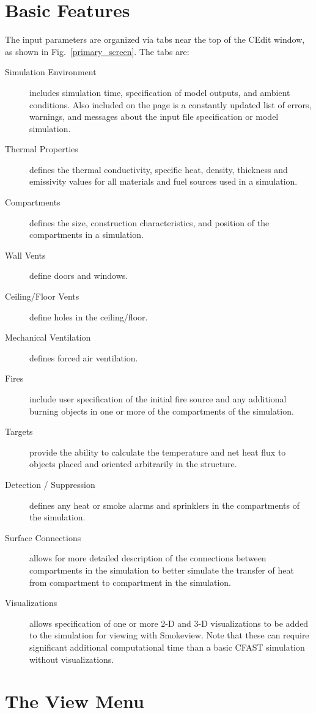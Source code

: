 \section{Basic Features}

The input parameters are organized via tabs near the top of the CEdit window, as shown in Fig.~\ref{primary_screen}. The tabs are:
\begin{description}
\item[Simulation Environment] includes simulation time, specification of model outputs, and ambient conditions. Also included on the page is a constantly updated list of errors, warnings, and messages about the input file specification or model simulation.
\item[Thermal Properties] defines the thermal conductivity, specific heat, density, thickness and emissivity values for all materials and fuel sources used in a simulation.
\item[Compartments] defines the size, construction characteristics, and position of the compartments in a simulation.
\item[Wall Vents] define doors and windows.
\item[Ceiling/Floor Vents] define holes in the ceiling/floor.
\item[Mechanical Ventilation] defines forced air ventilation.
\item[Fires] include user specification of the initial fire source and any additional burning objects in one or more of the compartments of the simulation.
\item[Targets] provide the ability to calculate the temperature and net heat flux to objects placed and oriented arbitrarily in the structure.
\item[Detection / Suppression] defines any heat or smoke alarms and sprinklers in the compartments of the simulation.
\item[Surface Connections] allows for more detailed description of the connections between compartments in the simulation to better simulate the transfer of heat from compartment to compartment in the simulation.
\item[Visualizations] allows specification of one or more 2-D and 3-D visualizations to be added to the simulation for viewing with Smokeview. Note that these can require significant additional computational time than a basic CFAST simulation without visualizations.
\end{description}


\section{The View Menu}


